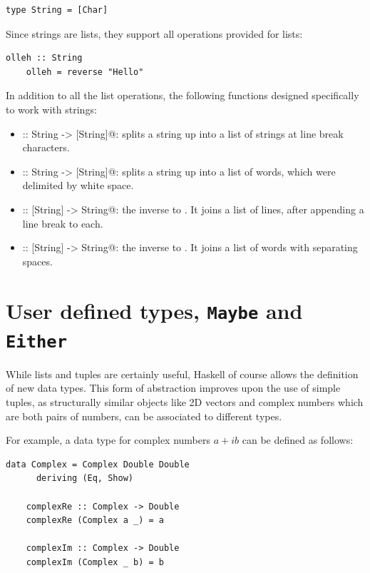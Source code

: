 \documentclass[UdineBachThesis,american,11pt]{PhdThesis}
\begin{document}
  \begin{lstlisting}[gobble=4,basicstyle=\ttfamily\small]
    type String = [Char]
  \end{lstlisting}

  Since strings are lists, they support all operations provided for lists:

  \begin{lstlisting}[gobble=4,basicstyle=\ttfamily\small]
    olleh :: String
    olleh = reverse "Hello"
  \end{lstlisting}

  In addition to all the list operations, the following functions designed
  specifically to work with strings:

  \begin{itemize}
    \item \lstinline@lines :: String -> [String]@: splits a string up into a
    list of strings at line break characters.

    \item \lstinline@words :: String -> [String]@: splits a string up into a
    list of words, which were delimited by white space.

    \item \lstinline@unlines :: [String] -> String@: the inverse to
    \lstinline@lines@. It joins a list of lines, after appending a line break to
    each.

    \item \lstinline@unwords :: [String] -> String@: the inverse to
    \lstinline@words@. It joins a list of words with separating spaces.
  \end{itemize}

  \section{User defined types, \texttt{Maybe} and \texttt{Either}}
  \label{section:udt}

  While lists and tuples are certainly useful, Haskell of course allows the
  definition of new data types. This form of abstraction improves upon the use
  of simple tuples, as structurally similar objects like 2D vectors and complex
  numbers which are both pairs of numbers, can be associated to different types.

  For example, a data type for complex numbers $a + i b$ can be defined as
  follows:

  \begin{lstlisting}[gobble=4,basicstyle=\ttfamily\small]
    data Complex = Complex Double Double
      deriving (Eq, Show)

    complexRe :: Complex -> Double
    complexRe (Complex a _) = a

    complexIm :: Complex -> Double
    complexIm (Complex _ b) = b
  \end{lstlisting}
\end{document}

